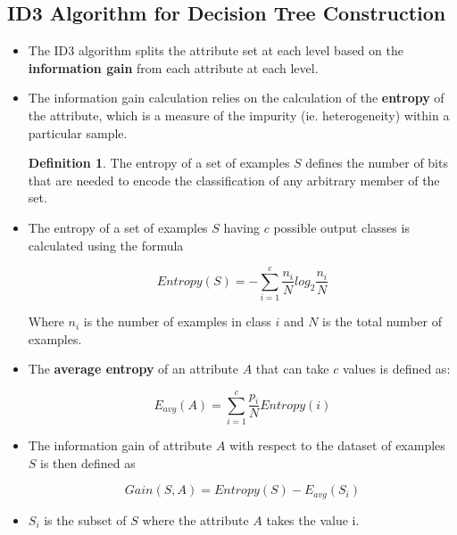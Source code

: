 \documentclass{article}
\theoremstyle{plain}
\theoremstyle{definition}
\newtheorem{defn}{Definition} %
\begin{document}
\subsection{ID3 Algorithm for Decision Tree Construction}
\begin{itemize}
    \item The ID3 algorithm splits the attribute set at each level based on the \textbf{information gain} from each attribute at each level. 
    
    \item The information gain calculation relies on the calculation of the \textbf{entropy} of the attribute, which is a measure of the impurity (ie. heterogeneity) within a particular sample.
    
    \begin{defn}
    The entropy of a set of examples $S$ defines the number of bits that are needed to encode the classification of any arbitrary member of the set.
    \end{defn}
    
    \item The entropy of a set of examples $S$ having $c$ possible output classes is calculated using the formula
    
    \begin{equation}
        Entropy(S) = - \sum_{i=1}^{c} \frac{n_i}{N} log_{2} \frac{n_i}{N}
    \end{equation}
    
    Where $n_i$ is the number of examples in class $i$ and $N$ is the total number of examples.
    
    \item The \textbf{average entropy} of an attribute $A$ that can take $c$ values is defined as:
    
    \begin{equation}
            E_{avg}(A) = \sum_{i=1}^{c} \frac{p_i}{N} Entropy(i)
    \end{equation}
    
    \item The information gain of attribute $A$ with respect to the dataset of examples $S$ is then defined as
    
    \begin{equation}
        Gain(S, A) = Entropy(S) - E_{avg}(S_i)
    \end{equation}
    
    \item $S_i$ is the subset of $S$ where the attribute $A$ takes the value i. 
\end{itemize}
\end{document}
